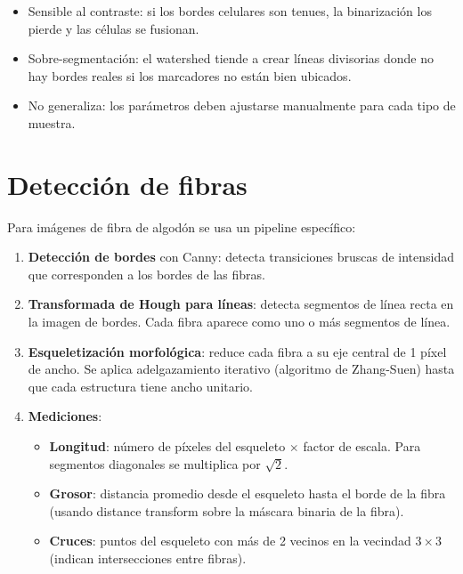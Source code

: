 \documentclass[11pt,a4paper]{article}
\begin{document}
\begin{itemize}
  \item Sensible al contraste: si los bordes celulares son tenues, la binarizaci\'{o}n los pierde y las c\'{e}lulas se fusionan.
  \item Sobre-segmentaci\'{o}n: el watershed tiende a crear l\'{i}neas divisorias donde no hay bordes reales si los marcadores no est\'{a}n bien ubicados.
  \item No generaliza: los par\'{a}metros deben ajustarse manualmente para cada tipo de muestra.
\end{itemize}

\section{Detecci\'{o}n de fibras}
\label{sec:fibras}

Para im\'{a}genes de fibra de algod\'{o}n se usa un pipeline espec\'{i}fico:

\begin{enumerate}
  \item \textbf{Detecci\'{o}n de bordes} con Canny: detecta transiciones bruscas de intensidad que corresponden a los bordes de las fibras.

  \item \textbf{Transformada de Hough para l\'{i}neas}: detecta segmentos de l\'{i}nea recta en la imagen de bordes. Cada fibra aparece como uno o m\'{a}s segmentos de l\'{i}nea.

  \item \textbf{Esqueletizaci\'{o}n morfol\'{o}gica}: reduce cada fibra a su eje central de 1 p\'{i}xel de ancho. Se aplica adelgazamiento iterativo (algoritmo de Zhang-Suen) hasta que cada estructura tiene ancho unitario.

  \item \textbf{Mediciones}:
  \begin{itemize}
    \item \textbf{Longitud}: n\'{u}mero de p\'{i}xeles del esqueleto $\times$ factor de escala. Para segmentos diagonales se multiplica por $\sqrt{2}$.
    \item \textbf{Grosor}: distancia promedio desde el esqueleto hasta el borde de la fibra (usando distance transform sobre la m\'{a}scara binaria de la fibra).
    \item \textbf{Cruces}: puntos del esqueleto con m\'{a}s de 2 vecinos en la vecindad $3 \times 3$ (indican intersecciones entre fibras).
  \end{itemize}
\end{enumerate}
\end{document}
